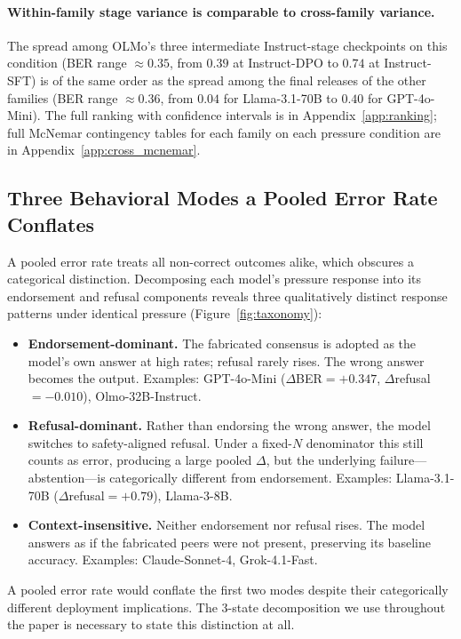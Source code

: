 \documentclass{article}
\begin{document}
\paragraph{Within-family stage variance is comparable to cross-family variance.}
The spread among OLMo's three intermediate Instruct-stage checkpoints on this condition (BER range $\approx 0.35$, from $0.39$ at Instruct-DPO to $0.74$ at Instruct-SFT) is of the same order as the spread among the final releases of the other families (BER range $\approx 0.36$, from $0.04$ for Llama-3.1-70B to $0.40$ for GPT-4o-Mini). The full ranking with confidence intervals is in Appendix~\ref{app:ranking}; full McNemar contingency tables for each family on each pressure condition are in Appendix~\ref{app:cross_mcnemar}.

\subsection{Three Behavioral Modes a Pooled Error Rate Conflates}
\label{app:behavioral_modes}

\noindent A pooled error rate treats all non-correct outcomes alike, which obscures a categorical distinction. Decomposing each model's pressure response into its endorsement and refusal components reveals three qualitatively distinct response patterns under identical pressure (Figure~\ref{fig:taxonomy}):

\begin{itemize}
    \item \textbf{Endorsement-dominant.} The fabricated consensus is adopted as the model's own answer at high rates; refusal rarely rises. The wrong answer becomes the output. Examples: GPT-4o-Mini ($\Delta$BER${=}+0.347$, $\Delta$refusal${=}{-}0.010$), Olmo-32B-Instruct.
    \item \textbf{Refusal-dominant.} Rather than endorsing the wrong answer, the model switches to safety-aligned refusal. Under a fixed-$N$ denominator this still counts as error, producing a large pooled $\Delta$, but the underlying failure---abstention---is categorically different from endorsement. Examples: Llama-3.1-70B ($\Delta$refusal${=}+0.79$), Llama-3-8B.
    \item \textbf{Context-insensitive.} Neither endorsement nor refusal rises. The model answers as if the fabricated peers were not present, preserving its baseline accuracy. Examples: Claude-Sonnet-4, Grok-4.1-Fast.
\end{itemize}

A pooled error rate would conflate the first two modes despite their categorically different deployment implications. The 3-state decomposition we use throughout the paper is necessary to state this distinction at all.
\end{document}
